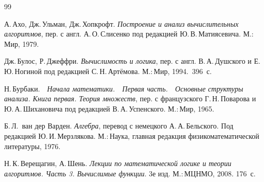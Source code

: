 \begin{thebibliography}{99}

А.\,Ахо, Дж.\,Ульман, Дж.\,Хопкрофт. \textit{Построение и анализ
вычислительных алгоритмов}, пер. с англ. А.\,О.\,Слисенко
под редакцией Ю.\,В.\,Мати\-ясевича. М.:\,Мир, 1979.

Дж.\,Булос, Р.\,Джеффри. \textit{Вычислимость и логика},
пер. с англ. В.\,А.\,Душского и Е.\,Ю.\,Но\-ги\-ной под
редакцией С.\,Н.\,Артёмова.
М.:\,Мир, 1994.\ 396~с.



Н.\,Бурбаки.\ \ \textit{Начала математики.\  \ Первая часть.\ \ Основные
структуры анализа. Книга первая. Теория множеств},
пер. с французского Г.\,Н.\,По\-ва\-ро\-ва и
Ю.\,А.\,Шихановича под редакцией В.\,А.\,Ус\-пен\-ско\-го.
М.:\,Мир, 1965.

%
%
%
%


Б.\,Л.\, ван дер Варден. \textit{Алгебра}, перевод с немецкого
А.\,А.\,Бель\-с\-ко\-го. Под редакцией Ю.\,И.\,Мерзлякова. М.:\,Наука,
главная редакция физико\д ма\-те\-ма\-ти\-чес\-кой литературы, 1976.

%
%
%


Н.\,К.\,Верещагин, А.\,Шень. \textit{Лекции по математичес\-кой логике и
теории алгоритмов. Часть 3. Вычислимые фун\-кции}. 3\д е изд.
М.:\,МЦНМО, 2008.
176~с.


\end{thebibliography}
